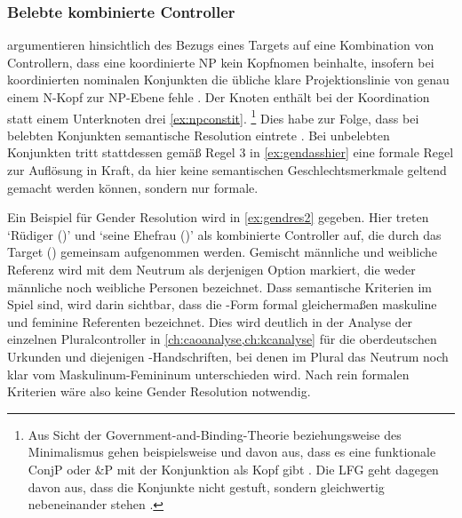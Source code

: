 \subsubsection{Belebte kombinierte Controller}
\label{subsubsec:x+x_dir_anim}

\textcites[182--183]{wechslerzlatic2003}[576]{wechsler2009} argumentieren
hinsichtlich des Bezugs eines Targets auf eine Kombination von Controllern,
dass eine koordinierte NP kein Kopf\-nomen beinhalte, insofern bei
koordinierten nominalen Konjunkten die übliche klare Projektionslinie von genau
einem N-Kopf zur NP-Ebene fehle \autocites[183,
Anm.~85]{wechslerzlatic2003}[585, Anm.~7]{wechsler2009}. Der Knoten 
enthält bei der Koordination statt einem Unterknoten drei \cref{ex:npconstit}.%
%
	\footnote{Aus Sicht der Government-and-Binding-Theorie beziehungsweise des
	Minimalismus gehen beispielsweise
	\textcites{johannessen1998}{johannessen2005} und \citet{shen2019} davon aus, dass es
	eine funktionale ConjP oder \&P mit der Konjunktion als Kopf gibt
	\autocite[dagegen aber][]{borsley2005}. Die LFG geht dagegen davon aus,
	dass die Konjunkte nicht gestuft, sondern gleichwertig nebeneinander stehen
	\autocites[vgl.~z.\,B.][]{peterson2004}{sadlernordlinger2006}.}
%
Dies habe zur Folge, dass bei belebten Konjunkten semantische Resolution
eintrete \autocites[183]{wechslerzlatic2003}[576]{wechsler2009}. Bei unbelebten
Konjunkten tritt stattdessen gemäß Regel 3 in \cref{ex:gendasshier} eine
formale Regel zur Auflösung in Kraft, da hier keine semantischen
Geschlechtsmerkmale geltend gemacht werden können, sondern nur formale.

Ein Beispiel für Gender Resolution wird in \cref{ex:gendres2} gegeben. Hier
treten  `Rüdiger (\MascM)' und 
`seine Ehefrau (\FemF)' als kombinierte Controller auf, die durch das
Target  (\NeutMF) gemeinsam aufgenommen werden. Gemischt männliche
und weibliche Referenz wird mit dem Neutrum als derjenigen Option markiert,
die weder männliche noch weibliche Personen bezeichnet. Dass semantische
Kriterien im Spiel sind, wird darin sichtbar, dass die -Form formal
gleichermaßen maskuline und feminine Referenten bezeichnet. Dies wird deutlich
in der Analyse der einzelnen Pluralcontroller in
\cref{ch:caoanalyse,ch:kcanalyse} für die oberdeutschen Urkunden und diejenigen
\KC{}-Handschriften, bei denen im Plural das Neutrum noch klar vom
Maskulinum-Femininum unterschieden wird. Nach rein formalen Kriterien wäre also
keine Gender Resolution notwendig.

